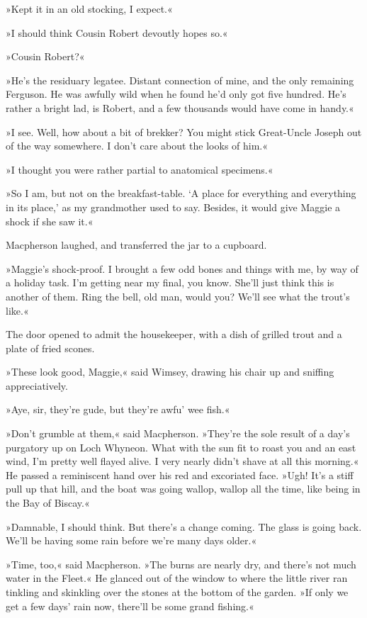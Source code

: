 »Kept it in an old stocking, I expect.«

»I should think Cousin Robert devoutly hopes so.«

»Cousin Robert?«

»He's the residuary legatee. Distant connection of mine, and the only remaining Ferguson. He was awfully wild when he found he'd only got five hundred. He's rather a bright lad, is Robert, and a few thousands would have come in handy.«

»I see. Well, how about a bit of brekker? You might stick Great-Uncle Joseph out of the way somewhere. I don't care about the looks of him.«

»I thought you were rather partial to anatomical specimens.«

»So I am, but not on the breakfast-table. `A place for everything and everything in its place,' as my grandmother used to say. Besides, it would give Maggie a shock if she saw it.«

Macpherson laughed, and transferred the jar to a cupboard.

»Maggie's shock-proof. I brought a few odd bones and things with me, by way of a holiday task. I'm getting near my final, you know. She'll just think this is another of them. Ring the bell, old man, would you? We'll see what the trout's like.«

The door opened to admit the housekeeper, with a dish of grilled trout and a plate of fried scones.

»These look good, Maggie,« said Wimsey, drawing his chair up and sniffing appreciatively.

»Aye, sir, they're gude, but they're awfu' wee fish.«

»Don't grumble at them,« said Macpherson. »They're the sole result of a day's purgatory up on Loch Whyneon. What with the sun fit to roast you and an east wind, I'm pretty well flayed alive. I very nearly didn't shave at all this morning.« He passed a reminiscent hand over his red and excoriated face. »Ugh! It's a stiff pull up that hill, and the boat was going wallop, wallop all the time, like being in the Bay of Biscay.«

»Damnable, I should think. But there's a change coming. The glass is going back. We'll be having some rain before we're many days older.«

»Time, too,« said Macpherson. »The burns are nearly dry, and there's not much water in the Fleet.« He glanced out of the window to where the little river ran tinkling and skinkling over the stones at the bottom of the garden. »If only we get a few days' rain now, there'll be some grand fishing.«

